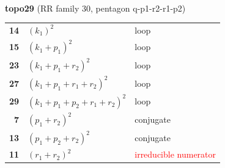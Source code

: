 \documentclass[10pt]{article}
\begin{document}
\begin{minipage}[t]{0.48\textwidth}
{}\\[2mm]\textbf{topo29} (RR family 30, pentagon q-p1-r2-r1-p2)\\[2pt]{\footnotesize\begin{tabular}{@{}r@{\ \ }l@{\ \ }l@{}}\textbf{14} & $(k_1)^2$ & loop\\
\textbf{15} & $(k_1+p_1)^2$ & loop\\
\textbf{23} & $(k_1+p_1+r_2)^2$ & loop\\
\textbf{27} & $(k_1+p_1+r_1+r_2)^2$ & loop\\
\textbf{29} & $(k_1+p_1+p_2+r_1+r_2)^2$ & loop\\
\textbf{7} & $(p_1+r_2)^2$ & conjugate\\
\textbf{13} & $(p_1+p_2+r_2)^2$ & conjugate\\
\textbf{11} & $(r_1+r_2)^2$ & \textcolor{red}{irreducible numerator}\\\end{tabular}}\end{minipage}\hfill%
\end{document}
